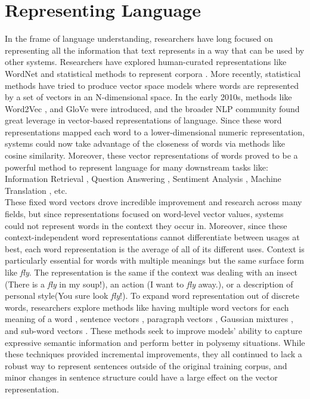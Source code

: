 \section{Representing Language}
\label{chap:intro:sec:lm}
In the frame of language understanding, researchers have long focused on representing all the information that text represents in a way that can be used by other systems. Researchers have explored human-curated representations like WordNet \cite{Miller1992WordNetAL}  and statistical methods to represent corpora \cite{Leacock1993TowardsBC}. More recently, statistical methods have tried to produce vector space models where words are represented by a set of vectors in an N-dimensional space. In the early 2010s, methods like Word2Vec \cite{Mikolov2013EfficientEO}, and GloVe \cite{Pennington2014GloveGV} were introduced, and the broader NLP community found great leverage in vector-based representations of language. Since these word representations mapped each word to a lower-dimensional numeric representation, systems could now take advantage of the closeness of words via methods like cosine similarity. Moreover, these vector representations of words proved to be a powerful method to represent language for many downstream tasks like: Information Retrieval \cite{Roy2018UsingWE}, Question Answering \cite{Othman2017AWE}, Sentiment Analysis \cite{Zhou2016ECNUAS}, Machine Translation \cite{Zou2013BilingualWE}, etc. \\
These fixed word vectors drove incredible improvement and research across many fields, but since representations focused on word-level vector values, systems could not represent words in the context they occur in. Moreover, since these context-independent word representations cannot differentiate between usages at best, each word representation is the average of all of its different uses. Context is particularly essential for words with multiple meanings but the same surface form like \emph{fly}. The representation is the same if the context was dealing with an insect (There is a \emph{fly} in my soup!), an action (I want to \emph{fly} away.), or a description of personal style(You sure look \emph{fly}!). To expand word representation out of discrete words, researchers explore methods like having multiple word vectors for each meaning of a word \cite{Hu2016DifferentCL}, sentence vectors \cite{Kiros2015SkipThoughtV}, paragraph vectors \cite{Le2014DistributedRO}, Gaussian mixtures \cite{Athiwaratkun2017MultimodalWD}, and sub-word vectors \cite{Bojanowski2017EnrichingWV}. These methods seek to improve models' ability to capture expressive semantic information and perform better in polysemy situations. While these techniques provided incremental improvements, they all continued to lack a robust way to represent sentences outside of the original training corpus, and minor changes in sentence structure could have a large effect on the vector representation. \\ 
